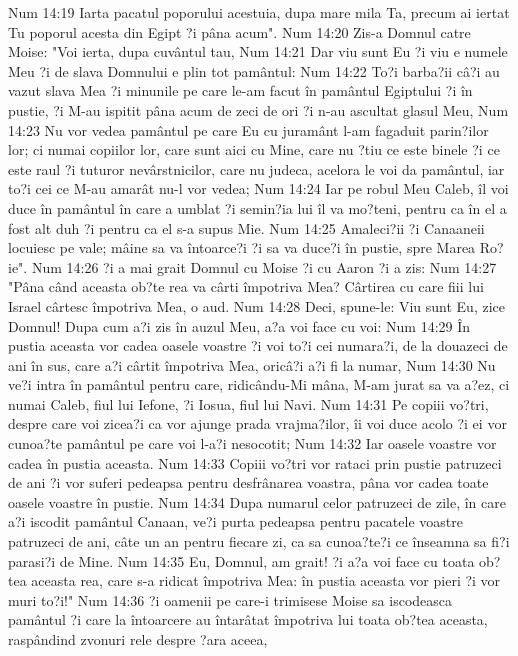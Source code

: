 Num 14:19  Iarta pacatul poporului acestuia, dupa mare mila Ta, precum ai iertat Tu poporul acesta din Egipt ?i pâna acum".
Num 14:20  Zis-a Domnul catre Moise: "Voi ierta, dupa cuvântul tau,
Num 14:21  Dar viu sunt Eu ?i viu e numele Meu ?i de slava Domnului e plin tot pamântul:
Num 14:22  To?i barba?ii câ?i au vazut slava Mea ?i minunile pe care le-am facut în pamântul Egiptului ?i în pustie, ?i M-au ispitit pâna acum de zeci de ori ?i n-au ascultat glasul Meu,
Num 14:23  Nu vor vedea pamântul pe care Eu cu juramânt l-am fagaduit parin?ilor lor; ci numai copiilor lor, care sunt aici cu Mine, care nu ?tiu ce este binele ?i ce este raul ?i tuturor nevârstnicilor, care nu judeca, acelora le voi da pamântul, iar to?i cei ce M-au amarât nu-l vor vedea;
Num 14:24  Iar pe robul Meu Caleb, îl voi duce în pamântul în care a umblat ?i semin?ia lui îl va mo?teni, pentru ca în el a fost alt duh ?i pentru ca el s-a supus Mie.
Num 14:25  Amaleci?ii ?i Canaaneii locuiesc pe vale; mâine sa va întoarce?i ?i sa va duce?i în pustie, spre Marea Ro?ie".
Num 14:26  ?i a mai grait Domnul cu Moise ?i cu Aaron ?i a zis:
Num 14:27  "Pâna când aceasta ob?te rea va cârti împotriva Mea? Cârtirea cu care fiii lui Israel cârtesc împotriva Mea, o aud.
Num 14:28  Deci, spune-le: Viu sunt Eu, zice Domnul! Dupa cum a?i zis în auzul Meu, a?a voi face cu voi:
Num 14:29  În pustia aceasta vor cadea oasele voastre ?i voi to?i cei numara?i, de la douazeci de ani în sus, care a?i cârtit împotriva Mea, oricâ?i a?i fi la numar,
Num 14:30  Nu ve?i intra în pamântul pentru care, ridicându-Mi mâna, M-am jurat sa va a?ez, ci numai Caleb, fiul lui Iefone, ?i Iosua, fiul lui Navi.
Num 14:31  Pe copiii vo?tri, despre care voi zicea?i ca vor ajunge prada vrajma?ilor, îi voi duce acolo ?i ei vor cunoa?te pamântul pe care voi l-a?i nesocotit;
Num 14:32  Iar oasele voastre vor cadea în pustia aceasta.
Num 14:33  Copiii vo?tri vor rataci prin pustie patruzeci de ani ?i vor suferi pedeapsa pentru desfrânarea voastra, pâna vor cadea toate oasele voastre în pustie.
Num 14:34  Dupa numarul celor patruzeci de zile, în care a?i iscodit pamântul Canaan, ve?i purta pedeapsa pentru pacatele voastre patruzeci de ani, câte un an pentru fiecare zi, ca sa cunoa?te?i ce înseamna sa fi?i parasi?i de Mine.
Num 14:35  Eu, Domnul, am grait! ?i a?a voi face cu toata ob?tea aceasta rea, care s-a ridicat împotriva Mea: în pustia aceasta vor pieri ?i vor muri to?i!"
Num 14:36  ?i oamenii pe care-i trimisese Moise sa iscodeasca pamântul ?i care la întoarcere au întarâtat împotriva lui toata ob?tea aceasta, raspândind zvonuri rele despre ?ara aceea,
